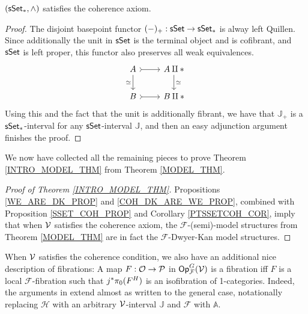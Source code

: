 \documentclass[a4paper,10pt
,draft
]{article}%
\renewcommand{\F}{\mathcal F}
\renewcommand{\1}{\eta}%
\begin{document}
\begin{corollary}
      \label{PTSSETCOH_COR}
      $(\sSet_{\**}, \wedge)$ satisfies the coherence axiom.
\end{corollary}
\begin{proof}
      The disjoint basepoint functor $(-)_+: \sSet \to \sSet_{\**}$ is alway left Quillen.
      Since additionally the unit in $\mathsf{sSet}$ is the terminal object and is cofibrant, and $\mathsf{sSet}$ is left proper,
      this functor also preserves all weak equivalences.
      {\color{OliveGreen} %
        \begin{equation}
              \begin{tikzcd}
                    A \arrow[r, rightarrowtail] \arrow[d, "\simeq"']
                    &
                    A \amalg \** \arrow[d, "\simeq"]
                    \\
                    B \arrow[r, rightarrowtail]
                    &
                    B \amalg \**
              \end{tikzcd}
        \end{equation}
      } %
      Using this and the fact that the unit is additionally fibrant, we have that $\mathbb J_+$ is a $\sSet_{\**}$-interval for any $\mathsf{sSet}$-interval $\mathbb J$,
      and then an easy adjunction argument finishes the proof.
\end{proof}

We now have collected all the remaining pieces to prove Theorem \ref{INTRO_MODEL_THM} from Theorem \ref{MODEL_THM}.

\begin{proof}
      [Proof of Theorem \ref{INTRO_MODEL_THM}]
      Propositions \ref{WE_ARE_DK_PROP} and \ref{COH_DK_ARE_WE_PROP},
      combined with Proposition \ref{SSET_COH_PROP} and Corollary \ref{PTSSETCOH_COR},
      imply that when $\mathcal V$ satisfies the coherence axiom, 
      the $\F$-(semi)-model structures from Theorem \ref{MODEL_THM} are in fact the $\F$-Dwyer-Kan model structures.
\end{proof}




\begin{remark}
      \label{FIB_ISOFIB_REM}
      When $\mathcal V$ satisfies the coherence condition, we also have an additional nice description of fibrations:
      A map $F: \mathcal{O} \to \mathcal{P}$ in $\Op^G_\F(\V)$ is a fibration iff
      $F$ is a local $\F$-fibration such that
      $j^{\**}\pi_0(F^H)$ is an isofibration of 1-categories.
      Indeed, the arguments in \cite[Propositions 2.3 and 2.5]{Ber07b} extend almost as written to the general case,
      notationally replacing $\mathcal H$ with an arbitrary $\mathcal V$-interval $\mathbb J$ and
      $\mathscr F$ with $\mathbb A$.
\end{remark}
\end{document}
